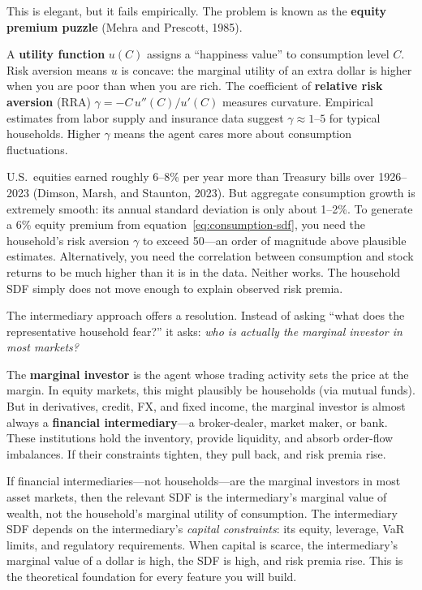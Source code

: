 This is elegant, but it fails empirically. The problem is known as the \textbf{equity premium puzzle} (Mehra and Prescott, 1985).

\begin{prereq}
A \textbf{utility function} $u(C)$ assigns a ``happiness value'' to consumption level $C$. Risk aversion means $u$ is concave: the marginal utility of an extra dollar is higher when you are poor than when you are rich. The coefficient of \textbf{relative risk aversion} (RRA) $\gamma = -C \, u''(C)/u'(C)$ measures curvature. Empirical estimates from labor supply and insurance data suggest $\gamma \approx 1$--$5$ for typical households. Higher $\gamma$ means the agent cares more about consumption fluctuations.
\end{prereq}

\begin{keyidea}
U.S.\ equities earned roughly 6--8\% per year more than Treasury bills over 1926--2023 (Dimson, Marsh, and Staunton, 2023). But aggregate consumption growth is extremely smooth: its annual standard deviation is only about 1--2\%. To generate a 6\% equity premium from equation~\eqref{eq:consumption-sdf}, you need the household's risk aversion $\gamma$ to exceed 50---an order of magnitude above plausible estimates. Alternatively, you need the correlation between consumption and stock returns to be much higher than it is in the data. Neither works. The household SDF simply does not move enough to explain observed risk premia.
\end{keyidea}

The intermediary approach offers a resolution. Instead of asking ``what does the representative household fear?'' it asks: \emph{who is actually the marginal investor in most markets?}

\begin{prereq}
The \textbf{marginal investor} is the agent whose trading activity sets the price at the margin. In equity markets, this might plausibly be households (via mutual funds). But in derivatives, credit, FX, and fixed income, the marginal investor is almost always a \textbf{financial intermediary}---a broker-dealer, market maker, or bank. These institutions hold the inventory, provide liquidity, and absorb order-flow imbalances. If their constraints tighten, they pull back, and risk premia rise.
\end{prereq}

\begin{keyidea}
If financial intermediaries---not households---are the marginal investors in most asset markets, then the relevant SDF is the intermediary's marginal value of wealth, not the household's marginal utility of consumption. The intermediary SDF depends on the intermediary's \emph{capital constraints}: its equity, leverage, VaR limits, and regulatory requirements. When capital is scarce, the intermediary's marginal value of a dollar is high, the SDF is high, and risk premia rise. This is the theoretical foundation for every feature you will build.
\end{keyidea}

